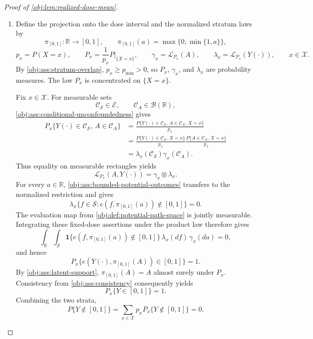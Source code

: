 \documentclass[11pt]{article}
\begin{document}
\begin{proof}[Proof of \cref{obj:lem:realized-dose-mean}]
\begin{enumerate}
\item Define the projection onto the dose interval and the normalized stratum laws by
\[
\pi_{[0,1]}:\mathbb R\longrightarrow[0,1],
\qquad
\pi_{[0,1]}(a)=\max\{0,\min\{1,a\}\},
\]
\[
p_x=P(X=x),
\qquad
P_x=\frac{1}{p_x}P|_{\{X=x\}},
\qquad
\gamma_x=\mathcal L_{P_x}(A),
\qquad
\lambda_x=\mathcal L_{P_x}(Y(\cdot)),
\qquad x\in\mathcal X.
\]
By \cref{obj:ass:stratum-overlap}, \(p_x\ge p_{\min}>0\), so \(P_x\), \(\gamma_x\), and \(\lambda_x\) are probability measures. The law \(P_x\) is concentrated on \(\{X=x\}\).

Fix \(x\in\mathcal X\). For measurable sets
\[
\mathcal C_{\mathcal S}\in\mathcal E,
\qquad
\mathcal C_A\in\mathcal B(\mathbb R),
\]
\cref{obj:ass:conditional-unconfoundedness} gives
\[
\begin{aligned}
P_x\{Y(\cdot)\in\mathcal C_{\mathcal S},\,A\in\mathcal C_A\}
&=\frac{P\{Y(\cdot)\in\mathcal C_{\mathcal S},\,A\in\mathcal C_A,\,X=x\}}{p_x}\\
&=\frac{P\{Y(\cdot)\in\mathcal C_{\mathcal S},\,X=x\}}{p_x}
  \frac{P\{A\in\mathcal C_A,\,X=x\}}{p_x}\\
&=\lambda_x(\mathcal C_{\mathcal S})\gamma_x(\mathcal C_A).
\end{aligned}
\]
Thus equality on measurable rectangles yields
\[
\mathcal L_{P_x}(A,Y(\cdot))=\gamma_x\otimes\lambda_x.
\]
For every \(a\in\mathbb R\), \cref{obj:ass:bounded-potential-outcomes} transfers to the normalized restriction and gives
\[
\lambda_x\bigl\{f\in\mathcal S:
e(f,\pi_{[0,1]}(a))\notin[0,1]\bigr\}=0.
\]
The evaluation map from \cref{obj:def:potential-path-space} is jointly measurable. Integrating these fixed-dose assertions under the product law therefore gives
\[
\int_{\mathbb R}\int_{\mathcal S}
\mathbf1\{e(f,\pi_{[0,1]}(a))\notin[0,1]\}
\,\lambda_x(df)\,\gamma_x(da)=0,
\]
and hence
\[
P_x\{e(Y(\cdot),\pi_{[0,1]}(A))\in[0,1]\}=1.
\]
By \cref{obj:ass:latent-support}, \(\pi_{[0,1]}(A)=A\) almost surely under \(P_x\). Consistency from \cref{obj:ass:consistency} consequently yields
\[
P_x\{Y\in[0,1]\}=1.
\]
Combining the two strata,
\[
P\{Y\notin[0,1]\}
=\sum_{x\in\mathcal X}p_xP_x\{Y\notin[0,1]\}=0.
\]


\end{enumerate}
\end{proof}
\end{document}
